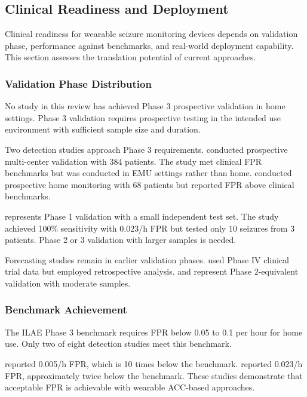 \subsection{Clinical Readiness and Deployment}

Clinical readiness for wearable seizure monitoring devices depends on validation phase, performance against benchmarks, and real-world deployment capability. This section assesses the translation potential of current approaches.

\subsubsection{Validation Phase Distribution}

No study in this review has achieved Phase 3 prospective validation in home settings. Phase 3 validation requires prospective testing in the intended use environment with sufficient sample size and duration.

Two detection studies approach Phase 3 requirements. \textcite{spahrDeepLearningbasedDetection2025} conducted prospective multi-center validation with 384 patients. The study met clinical FPR benchmarks but was conducted in EMU settings rather than home. \textcite{dongTwoLayerEnsembleMethod2022} conducted prospective home monitoring with 68 patients but reported FPR above clinical benchmarks.

\textcite{fineDetectionKeyAutomated2025} represents Phase 1 validation with a small independent test set. The study achieved 100\% sensitivity with 0.023/h FPR but tested only 10 seizures from 3 patients. Phase 2 or 3 validation with larger samples is needed.

Forecasting studies remain in earlier validation phases. \textcite{vielufSeizureMonitoringCombined2025} used Phase IV clinical trial data but employed retrospective analysis. \textcite{meiselMachineLearningWristband2020} and \textcite{nasseriAmbulatorySeizureForecasting2021} represent Phase 2-equivalent validation with moderate samples.

\subsubsection{Benchmark Achievement}

The ILAE Phase 3 benchmark requires FPR below 0.05 to 0.1 per hour for home use. Only two of eight detection studies meet this benchmark.

\textcite{spahrDeepLearningbasedDetection2025} reported 0.005/h FPR, which is 10 times below the benchmark. \textcite{fineDetectionKeyAutomated2025} reported 0.023/h FPR, approximately twice below the benchmark. These studies demonstrate that acceptable FPR is achievable with wearable ACC-based approaches.

